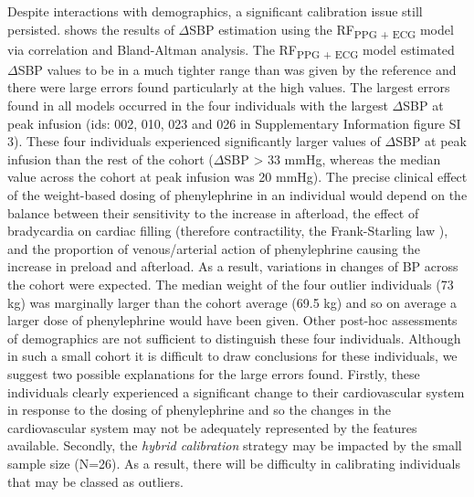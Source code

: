 \documentclass[fleqn,10pt]{wlscirep}
\begin{document}
Despite interactions with demographics, a significant calibration issue still persisted.  shows the results of $\Delta$SBP estimation using the RF\textsubscript{PPG + ECG} model via correlation and Bland-Altman analysis. The RF\textsubscript{PPG + ECG} model estimated $\Delta$SBP values to be in a much tighter range than was given by the reference and there were large errors found particularly at the high values. The largest errors found in all models occurred in the four individuals with the largest $\Delta$SBP at peak infusion (ids: 002, 010, 023 and 026 in Supplementary Information figure SI 3). These four individuals experienced significantly larger values of $\Delta$SBP at peak infusion than the rest of the cohort ($\Delta$SBP > 33 mmHg, whereas the median value across the cohort at peak infusion was 20 mmHg). The precise clinical effect of the weight-based dosing of phenylephrine in an individual would depend on the balance between their sensitivity to the increase in afterload, the effect of bradycardia on cardiac filling (therefore contractility, the Frank-Starling law \cite{Vincent2008}), and the proportion of venous/arterial action of phenylephrine causing the increase in preload and afterload. As a result, variations in changes of BP across the cohort were expected. The median weight of the four outlier individuals (73 kg) was marginally larger than the cohort average (69.5 kg) and so on average a larger dose of phenylephrine would have been given. Other post-hoc assessments of demographics are not sufficient to distinguish these four individuals. Although in such a small cohort it is difficult to draw conclusions for these individuals, we suggest two possible explanations for the large errors found. Firstly, these individuals clearly experienced a significant change to their cardiovascular system in response to the dosing of phenylephrine and so the changes in the cardiovascular system may not be adequately represented by the features available. Secondly, the \textit{hybrid calibration} strategy may be impacted by the small sample size (N=26). As a result, there will be difficulty in calibrating individuals that may be classed as outliers.
\end{document}
